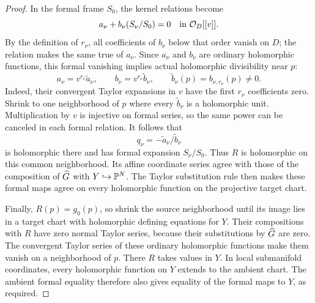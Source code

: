 \begin{proof}
In the formal frame \(S_0\), the kernel relations become
\[
a_\nu+b_\nu(S_\nu/S_0)=0
\quad\text{in }\mathcal O_D[[v]].
\]
By the definition of \(r_\nu\), all coefficients of \(b_\nu\)
below that order vanish on \(D\); the relation makes the same true
of \(a_\nu\). Since \(a_\nu\) and \(b_\nu\) are ordinary
holomorphic functions, this formal vanishing implies actual
holomorphic divisibility near \(p\):
\[
a_\nu=v^{r_\nu}\widetilde a_\nu,\qquad
b_\nu=v^{r_\nu}\widetilde b_\nu,
\qquad
\widetilde b_\nu(p)=b_{\nu,r_\nu}(p)\ne0.
\]
Indeed, their convergent Taylor expansions in \(v\) have the first
\(r_\nu\) coefficients zero. Shrink to one neighborhood of \(p\)
where every \(\widetilde b_\nu\) is a holomorphic unit.
Multiplication by \(v\) is injective on formal series, so the same
power can be canceled in each formal relation. It follows that
\[
q_\nu=-\widetilde a_\nu/\widetilde b_\nu
\]
is holomorphic there and has formal expansion \(S_\nu/S_0\).
Thus \(R\) is holomorphic on this common neighborhood. Its affine
coordinate series agree with those of the composition of \(\widehat G\)
with \(Y\hookrightarrow\mathbb P^N\). The Taylor substitution rule then
makes these formal maps agree on every holomorphic function on the
projective target chart.

Finally, \(R(p)=g_0(p)\), so shrink the source neighborhood until
its image lies in a target chart with holomorphic defining equations
for \(Y\).
Their compositions with \(R\) have zero normal Taylor series,
because their substitutions by \(\widehat G\) are zero. The convergent
Taylor series of these ordinary holomorphic functions make them
vanish on a neighborhood of \(p\). There \(R\) takes values in
\(Y\). In local submanifold coordinates, every holomorphic function
on \(Y\) extends to the ambient chart. The ambient formal equality
therefore also gives equality of the formal maps to \(Y\), as required.
\end{proof}


